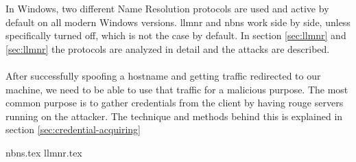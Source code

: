 \documentclass{article}
\begin{document}
In Windows, two different Name Resolution protocols are used and active by default on all modern Windows versions. \gls{llmnr} and \gls{nbns} work side by side, unless specifically turned off, which is not the case by default. In section \ref{sec:llmnr} and \ref{sec:llmnr} the protocols are analyzed in detail and the attacks are described.
\\\\
After successfully spoofing a hostname and getting traffic redirected to our machine, we need to be able to use that traffic for a malicious purpose. The most common purpose is to gather credentials from the client by having rouge servers running on the attacker. The technique and methods behind this is explained in section \ref{sec:credential-acquiring}

{nbns.tex}
{llmnr.tex}
\end{document}
